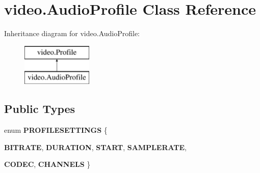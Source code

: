 \hypertarget{classvideo_1_1_audio_profile}{
\section{video.AudioProfile Class Reference}
\label{classvideo_1_1_audio_profile}
}
Inheritance diagram for video.AudioProfile:\begin{figure}[H]
\begin{center}
\leavevmode
\includegraphics[height=2.000000cm]{classvideo_1_1_audio_profile}
\end{center}
\end{figure}
\subsection*{Public Types}
\begin{DoxyCompactItemize}
\item 
enum {\bfseries PROFILESETTINGS} \{ \par
{\bfseries BITRATE}, 
{\bfseries DURATION}, 
{\bfseries START}, 
{\bfseries SAMPLERATE}, 
\par
{\bfseries CODEC}, 
{\bfseries CHANNELS}
 \}
\end{DoxyCompactItemize}
